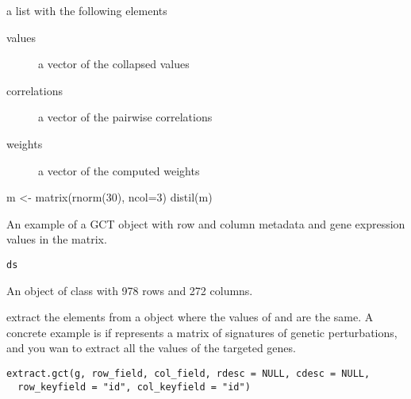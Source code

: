 \documentclass[letterpaper]{book}
\begin{document}
%
\begin{Value}
a list with the following elements
\begin{description}

\item[values] a vector of the collapsed values
\item[correlations] a vector of the pairwise correlations
\item[weights] a vector of the computed weights

\end{description}

\end{Value}
%
\begin{Examples}
\begin{ExampleCode}
m <- matrix(rnorm(30), ncol=3)
distil(m)

\end{ExampleCode}
\end{Examples}
%
\begin{Description}\relax
An example of a GCT object with row and
column metadata and gene expression values
in the matrix.
\end{Description}
%
\begin{Usage}
\begin{verbatim}
ds
\end{verbatim}
\end{Usage}
%
\begin{Format}
An object of class  with 978 rows and 272 columns.
\end{Format}
%
\begin{Description}\relax
extract the elements from a  object
where the values of  and 
are the same. A concrete example is if  represents
a matrix of signatures of genetic perturbations, and you wan
to extract all the values of the targeted genes.
\end{Description}
%
\begin{Usage}
\begin{verbatim}
extract.gct(g, row_field, col_field, rdesc = NULL, cdesc = NULL,
  row_keyfield = "id", col_keyfield = "id")
\end{verbatim}
\end{Usage}
%
\end{document}
